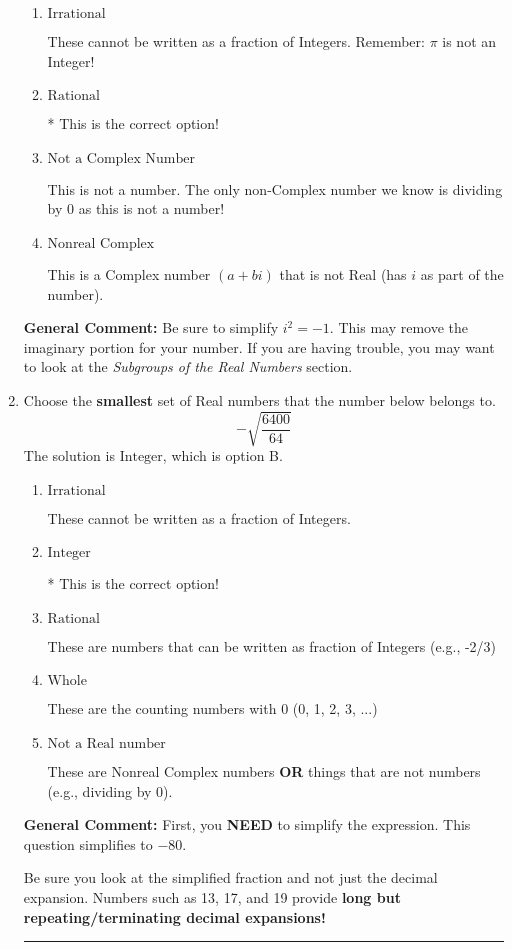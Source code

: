 \documentclass{extbook}[14pt]
\newcommand{\litem}[1]{\item #1

\rule{\textwidth}{0.4pt}}
\begin{document}
\begin{enumerate}
{\begin{enumerate}[label=\Alph*.]
This is a Complex number $(a+bi)$ that \textbf{only} has an imaginary part like $2i$.
\item \( \text{Irrational} \)

These cannot be written as a fraction of Integers. Remember: $\pi$ is not an Integer!
\item \( \text{Rational} \)

* This is the correct option!
\item \( \text{Not a Complex Number} \)

This is not a number. The only non-Complex number we know is dividing by 0 as this is not a number!
\item \( \text{Nonreal Complex} \)

This is a Complex number $(a+bi)$ that is not Real (has $i$ as part of the number).
\end{enumerate}

\textbf{General Comment:} Be sure to simplify $i^2 = -1$. This may remove the imaginary portion for your number. If you are having trouble, you may want to look at the \textit{Subgroups of the Real Numbers} section.
}
\litem{
Choose the \textbf{smallest} set of Real numbers that the number below belongs to.
\[ -\sqrt{\frac{6400}{64}} \]The solution is \( \text{Integer} \), which is option B.\begin{enumerate}[label=\Alph*.]
\item \( \text{Irrational} \)

These cannot be written as a fraction of Integers.
\item \( \text{Integer} \)

* This is the correct option!
\item \( \text{Rational} \)

These are numbers that can be written as fraction of Integers (e.g., -2/3)
\item \( \text{Whole} \)

These are the counting numbers with 0 (0, 1, 2, 3, ...)
\item \( \text{Not a Real number} \)

These are Nonreal Complex numbers \textbf{OR} things that are not numbers (e.g., dividing by 0).
\end{enumerate}

\textbf{General Comment:} First, you \textbf{NEED} to simplify the expression. This question simplifies to $-80$. 
 
 Be sure you look at the simplified fraction and not just the decimal expansion. Numbers such as 13, 17, and 19 provide \textbf{long but repeating/terminating decimal expansions!} 
 
}
\end{enumerate}
\end{document}

